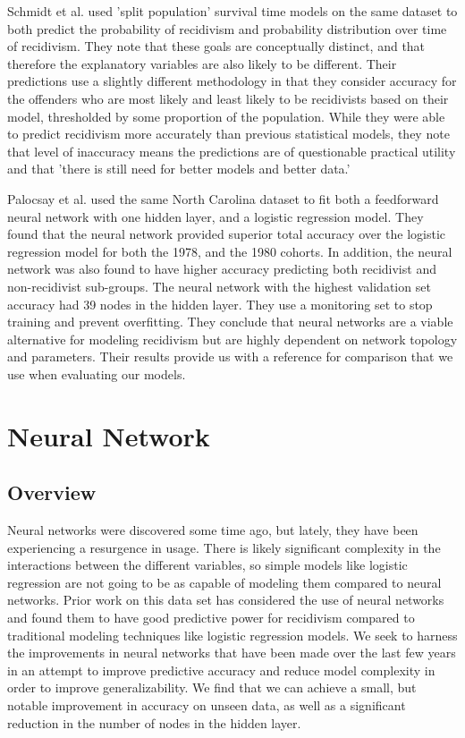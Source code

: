 \documentclass[a4paper]{article}
\theoremstyle{plain}
\begin{document}
Schmidt et al. \cite{schmidt1989predicting} used 'split population' survival time models on the same dataset to both predict the probability of recidivism and probability distribution over time of recidivism. They note that these goals are conceptually distinct, and that therefore the explanatory variables are also likely to be different. Their predictions use a slightly different methodology in that they consider accuracy for the offenders who are most likely and least likely to be recidivists based on their model, thresholded by some proportion of the population. While they were able to predict recidivism more accurately than previous statistical models, they note that level of inaccuracy means the predictions are of questionable practical utility and that 'there is still need for better models and better data.'

Palocsay et al. \cite{bib1} used the same North Carolina dataset to fit both a feedforward neural network with one hidden layer, and a logistic regression model. They found that the neural network provided superior total accuracy over the logistic regression model for both the 1978, and the 1980 cohorts. In addition, the neural network was also found to have higher accuracy predicting both recidivist and non-recidivist sub-groups. The neural network with the highest validation set accuracy had 39 nodes in the hidden layer. They use a monitoring set to stop training and prevent overfitting. They conclude that neural networks are a viable alternative for modeling recidivism but are highly dependent on network topology and parameters. Their results provide us with a reference for comparison that we use when evaluating our models.


\section{Neural Network}

\subsection{Overview}

Neural networks were discovered some time ago, but lately, they have been experiencing a resurgence in usage. There is likely significant complexity in the interactions between the different variables, so simple models like logistic regression are not going to be as capable of modeling them compared to neural networks. Prior work on this data set has considered the use of neural networks and found them to have good predictive power for recidivism compared to traditional modeling techniques like logistic regression models. We seek to harness the improvements in neural networks that have been made over the last few years in an attempt to improve predictive accuracy and reduce model complexity in order to improve generalizability. We find that we can achieve a small, but notable improvement in accuracy on unseen data, as well as a significant reduction in the number of nodes in the hidden layer.
\end{document}
